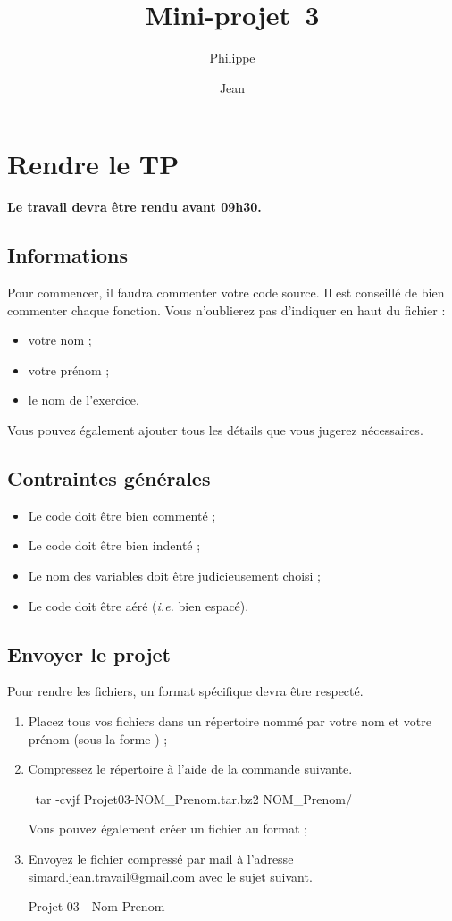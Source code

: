 \documentclass[a4paper]{article}
\title{Mini-projet~3}
\author{Philippe \Nom{Rinaudo}\and{}Jean \Nom{Simard}}
\date{\Date[l]{06}{11}{2009}}
\begin{document}
	\maketitle
	\section{Rendre le TP}
		\textbf{Le travail devra être rendu  avant 09h30.}
		\subsection{Informations}
			Pour commencer, il faudra commenter votre code source.
			Il est conseillé de bien commenter chaque fonction.
			Vous n'oublierez pas d'indiquer en haut du fichier :
			\begin{itemize}
				\item votre nom ;
				\item votre prénom ;
				\item le nom de l'exercice.
			\end{itemize}
			Vous pouvez également ajouter tous les détails que vous jugerez nécessaires.

		\subsection{Contraintes générales}
			\begin{itemize}
				\item Le code doit être bien commenté ;
				\item Le code doit être bien indenté ;
				\item Le nom des variables doit être judicieusement choisi ;
				\item Le code doit être aéré (\emph{i.e.} bien espacé).
			\end{itemize}

		\subsection{Envoyer le projet}
			Pour rendre les fichiers, un format spécifique devra être respecté.
			\begin{enumerate}
				\item Placez tous vos fichiers dans un répertoire nommé par votre nom et votre prénom (sous la forme ) ;
				\item Compressez le répertoire à l'aide de la commande suivante.
				\begin{Code*}
$~$ tar -cvjf Projet03-NOM_Prenom.tar.bz2 NOM_Prenom/
				\end{Code*}
				Vous pouvez également créer un fichier au format  ;
				\item Envoyez le fichier compressé  par mail à l'adresse \href{mailto:simard.jean.travail@gmail.com}{simard.jean.travail@gmail.com} avec le sujet suivant.
				\begin{Code*}
[CCI] Projet 03 - Nom Prenom
				\end{Code*}
			\end{enumerate}
\end{document}
